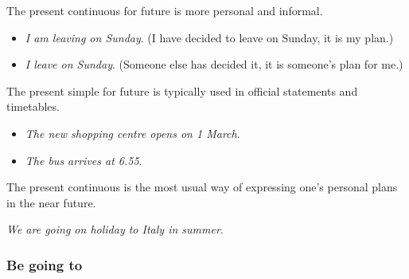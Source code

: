 The present continuous for future is more personal and informal.

\begin{itemize}
\item \textit{I am leaving on Sunday}. (I have decided to leave on Sunday, it is my plan.)
\item \textit{I leave on Sunday}.  (Someone else has decided it, it is someone's plan for me.)
\end{itemize}

The present simple for future is typically used in official statements and timetables.

\begin{itemize}
\item \textit{The new shopping centre opens on 1 March}.
\item \textit{The bus arrives at 6.55}.
\end{itemize}

The present continuous is the most usual way of expressing one's personal plans in the near future.

\textit{We are going on holiday to Italy in summer}.

\subsubsection{Be going to}


